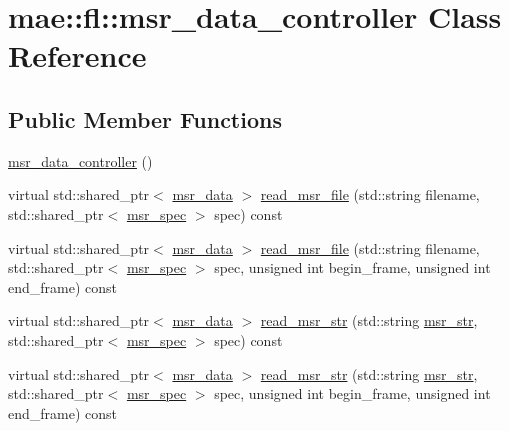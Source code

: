 \hypertarget{classmae_1_1fl_1_1msr__data__controller}{\section{mae\-:\-:fl\-:\-:msr\-\_\-data\-\_\-controller Class Reference}
\label{classmae_1_1fl_1_1msr__data__controller}
}
\subsection*{Public Member Functions}
\begin{DoxyCompactItemize}
\item 
\hyperlink{classmae_1_1fl_1_1msr__data__controller_a8c4a68a416dcf225c11fa002e166b018}{msr\-\_\-data\-\_\-controller} ()
\item 
virtual std\-::shared\-\_\-ptr$<$ \hyperlink{classmae_1_1fl_1_1msr__data}{msr\-\_\-data} $>$ \hyperlink{classmae_1_1fl_1_1msr__data__controller_aed6baed3a3b624e66ffd651aa1902643}{read\-\_\-msr\-\_\-file} (std\-::string filename, std\-::shared\-\_\-ptr$<$ \hyperlink{classmae_1_1fl_1_1msr__spec}{msr\-\_\-spec} $>$ spec) const 
\item 
virtual std\-::shared\-\_\-ptr$<$ \hyperlink{classmae_1_1fl_1_1msr__data}{msr\-\_\-data} $>$ \hyperlink{classmae_1_1fl_1_1msr__data__controller_aa3e79b2e0a16257ad18e12534b49d419}{read\-\_\-msr\-\_\-file} (std\-::string filename, std\-::shared\-\_\-ptr$<$ \hyperlink{classmae_1_1fl_1_1msr__spec}{msr\-\_\-spec} $>$ spec, unsigned int begin\-\_\-frame, unsigned int end\-\_\-frame) const 
\item 
virtual std\-::shared\-\_\-ptr$<$ \hyperlink{classmae_1_1fl_1_1msr__data}{msr\-\_\-data} $>$ \hyperlink{classmae_1_1fl_1_1msr__data__controller_ac91ad60a22d3d02f3bddb39ffa4d1f9a}{read\-\_\-msr\-\_\-str} (std\-::string \hyperlink{classmae_1_1fl_1_1msr__data__controller_acce417fa7af9f2fc41f771fa702f09bc}{msr\-\_\-str}, std\-::shared\-\_\-ptr$<$ \hyperlink{classmae_1_1fl_1_1msr__spec}{msr\-\_\-spec} $>$ spec) const 
\item 
virtual std\-::shared\-\_\-ptr$<$ \hyperlink{classmae_1_1fl_1_1msr__data}{msr\-\_\-data} $>$ \hyperlink{classmae_1_1fl_1_1msr__data__controller_aa30ff18880be3ba4432afa9e0279cd0e}{read\-\_\-msr\-\_\-str} (std\-::string \hyperlink{classmae_1_1fl_1_1msr__data__controller_acce417fa7af9f2fc41f771fa702f09bc}{msr\-\_\-str}, std\-::shared\-\_\-ptr$<$ \hyperlink{classmae_1_1fl_1_1msr__spec}{msr\-\_\-spec} $>$ spec, unsigned int begin\-\_\-frame, unsigned int end\-\_\-frame) const 

\end{DoxyCompactItemize}
